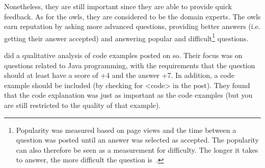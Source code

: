 Nonetheless, they are still important since they are able to provide quick feedback.
As for the owls, they are considered to be the domain experts.
The owls earn reputation by asking more advanced questions, providing better answers (i.e. getting their answer accepted) and answering popular and difficult\footnote{
	Popularity was measured based on page views and the time between a question was posted until an answer was selected as accepted.
	The popularity can also therefore be seen as a measurement for difficulty.
	The longer it takes to answer, the more difficult the question is~\cite[p.~273]{Yang2014}.
} questions.
\vspace{0.5em}\newline
\begin{comment}
\textcite{Posnett2012} views \gls{se} and \gls{so} as a learning community, since users help each gain new knowledge, and motivates learning.
They wanted to see if the quality of the users answers improved over time. 
By constructing a posting history for each user, they found that the overall answer score decreased, and that the answer quality was static.
\vspace{0.5em}\newline
\end{comment}
\textcite{Nasehi2012} did a qualitative analysis of code examples posted on \gls{so}. 
Their focus was on questions related to Java programming, with the requirements that the question should at least have a score of +4 and the answer +7. 
In addition, a code example should be included (by checking for <code> in the post).
They found that the code explanation was just as important as the code examples (but you are still restricted to the quality of that example).
\begin{comment}
For the code to be considered good, they listed the following attributes: 
\begin{enumerate}
	\item Concise code: Code samples should not be too long. 
	They should be simple, and only focus on the parts that are relevant to the topic.
	Additional or non-relevant parts should instead be documented by using descriptive comments.
	\item Question context: 
	If the code is not working properly, suggestions for improvement should be added. 
	One could also explain best practices and suggestions for improved readability.
	This will also have a pedagogical benefit, since the user asking the questions will learn to write better code.
	\item Highlighting important elements: 
	"Straight to the point", clearing up misunderstandings, pointing to relevant resources, etc.
	\item Step-by-step solution: 
	Splitting code into chunks, and explaining each chunk and its functionality.
	Comparison of languages; e.g. "How can I do X in C\#, when I'm used to Java?"
	\item Providing links to extra resources: 
	Answers can be kept short by adding links to external resources, but a short summary should still be added.
\end{enumerate}
\end{comment}



